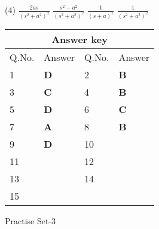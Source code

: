 \begin{enumerate}
\begin{tasks}(4)
\task[\textbf{A.}] $\frac{2 a s}{\left(s^{2}+a^{2}\right)^{2}}$
\task[\textbf{B.}]$\frac{s^{2}-a^{2}}{\left(s^{2}+a^{2}\right)^{2}}$
\task[\textbf{C.}]$\frac{1}{(s+a)^{2}}$
\task[\textbf{D.}]$\frac{1}{\left(s^{2}+a^{2}\right)^{2}}$
\end{tasks}
\end{enumerate}
\setlength\arrayrulewidth{1pt}
\begin{table}[H]
	\centering
	\begin{tabular}{|p{1.5cm}|p{1.5cm}||p{1.5cm}|p{1.5cm}|}
		\hline
		\multicolumn{4}{|c|}{\textbf{Answer key}}\\\hline\hline
		\rowcolor{ocrel}Q.No.&Answer&Q.No.&Answer\\\hline
		1&\textbf{D} &2&\textbf{B}\\\hline 
		3&\textbf{C} &4&\textbf{B} \\\hline
		5&\textbf{D} &6&\textbf{C} \\\hline
		7&\textbf{A}&8&\textbf{B}\\\hline
		9&\textbf{D}&10&\textbf{}\\\hline
		11&\textbf{} &12&\textbf{}\\\hline
		13&\textbf{}&14&\textbf{}\\\hline
		15&\textbf{}& &\\\hline
		
	\end{tabular}
\end{table}
\newpage
\begin{abox}
	Practise Set-3
\end{abox}
